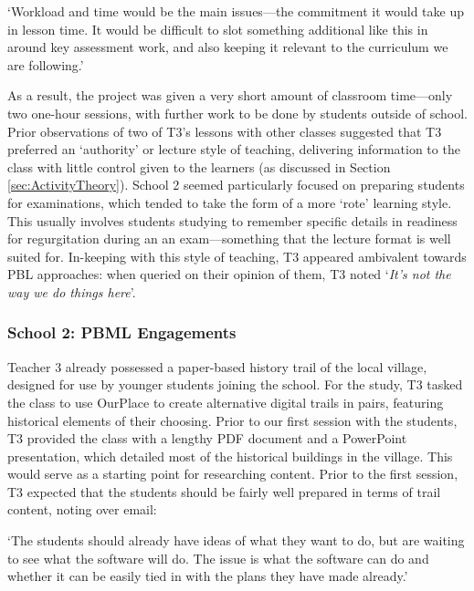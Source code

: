 \begin{displayquote}
`Workload and time would be the main issues---the commitment it would take up in lesson time. It would be difficult to slot something additional like this in around key assessment work, and also keeping it relevant to the curriculum we are following.'
\end{displayquote}

As a result, the project was given a very short amount of classroom time---only two one-hour sessions, with further work to be done by students outside of school. Prior observations of two of T3's lessons with other classes suggested that T3 preferred an `authority' or lecture style of teaching, delivering information to the class with little control given to the learners (as discussed in Section \ref{sec:ActivityTheory}). School 2 seemed particularly focused on preparing students for examinations, which tended to take the form of a more `rote' learning style. This usually involves students studying to remember specific details in readiness for regurgitation during an an exam---something that the lecture format is well suited for. In-keeping with this style of teaching, T3 appeared ambivalent towards PBL approaches: when queried on their opinion of them, T3 noted `\textit{It's not the way we do things here}'.

\subsubsection{School 2: PBML Engagements}

Teacher 3 already possessed a paper-based history trail of the local village, designed for use by younger students joining the school. For the study, T3 tasked the class to use OurPlace to create alternative digital trails in pairs, featuring historical elements of their choosing. Prior to our first session with the students, T3 provided the class with a lengthy PDF document and a PowerPoint presentation, which detailed most of the historical buildings in the village. This would serve as a starting point for researching content. Prior to the first session, T3 expected that the students should be fairly well prepared in terms of trail content, noting over email: 

\begin{displayquote}
`The students should already have ideas of what they want to do, but are waiting to see what the software will do. The issue is what the software can do and whether it can be easily tied in with the plans they have made already.'
\end{displayquote}

